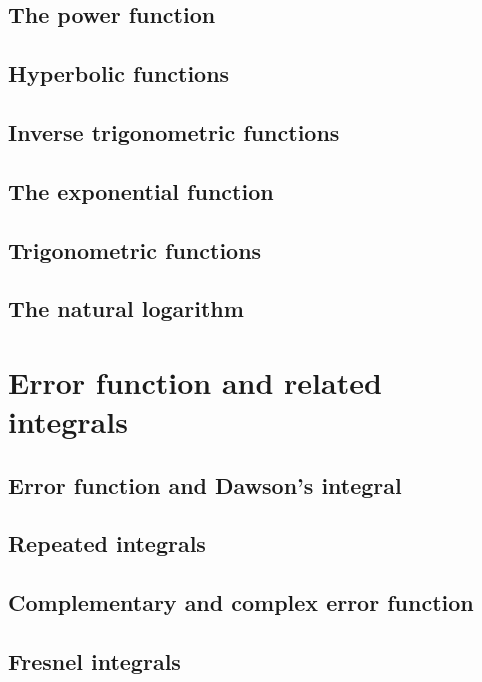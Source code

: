 \documentclass[11pt]{article}
\begin{document}
    \subsection{The power function}

    \subsection{Hyperbolic functions}

    \subsection{Inverse trigonometric functions}

    \subsection{The exponential function}

    \subsection{Trigonometric functions}

    \subsection{The natural logarithm}

  \section{Error function and related integrals}
    \subsection{Error function and Dawson's integral}

    \subsection{Repeated integrals}

    \subsection{Complementary and complex error function}

    \subsection{Fresnel integrals}
\end{document}
